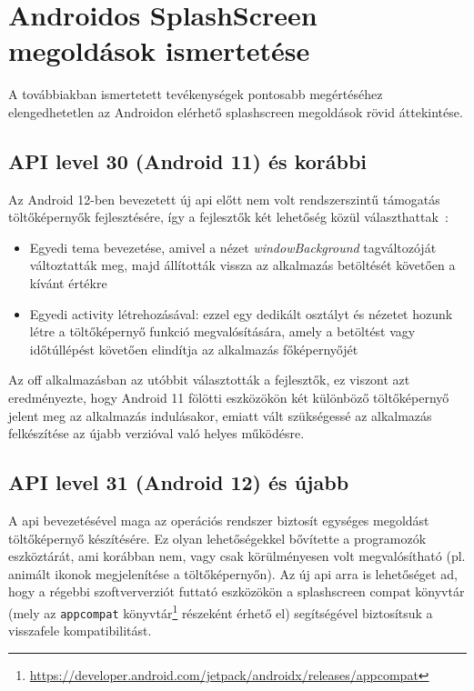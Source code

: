\chapter{Androidos SplashScreen megoldások ismertetése}


A továbbiakban ismertetett tevékenységek pontosabb megértéséhez elengedhetetlen
az Androidon elérhető \gls{splashscreen} megoldások rövid áttekintése.

\section{API level 30 (Android 11) és korábbi}
Az Android 12-ben bevezetett új \acrshort{api} előtt nem volt rendszerszintű támogatás töltőképernyők
fejlesztésére, így a fejlesztők két lehetőség közül választhattak~\cite{splashscreenmigration}:
\begin{itemize}
 \item Egyedi \gls{tema} bevezetése, amivel a nézet \textit{windowBackground} tagváltozóját változtatták meg,
 majd állították vissza az alkalmazás betöltését követően a kívánt értékre
 \item Egyedi \Gls{activity} létrehozásával: ezzel egy dedikált osztályt és nézetet hozunk létre
 a töltőképernyő funkció megvalósítására, amely a betöltést vagy időtúllépést követően elindítja
 az alkalmazás főképernyőjét
\end{itemize}

Az \acrlong{off} alkalmazásban az utóbbit választották a fejlesztők, ez viszont azt eredményezte,
hogy Android 11 fölötti eszközökön két különböző töltőképernyő jelent meg az alkalmazás indulásakor,
emiatt vált szükségessé az alkalmazás felkészítése az újabb verzióval való helyes működésre.

\section{API level 31 (Android 12) és újabb}
A  \acrshort{api} bevezetésével maga az operációs rendszer biztosít egységes megoldást
töltőképernyő készítésére. Ez olyan lehetőségekkel bővítette a programozók eszköztárát, ami korábban
nem, vagy csak körülményesen volt megvalósítható (pl. animált ikonok megjelenítése
a töltőképernyőn).
Az új \acrshort{api} arra is lehetőséget ad, hogy a régebbi szoftververziót futtató eszközökön a \gls{splashscreen}
compat könyvtár (mely az \texttt{\gls{appcompat}} könyvtár\footnote{\url{https://developer.android.com/jetpack/androidx/releases/appcompat}} részeként érhető el)
segítségével biztosítsuk a visszafele kompatibilitást.
